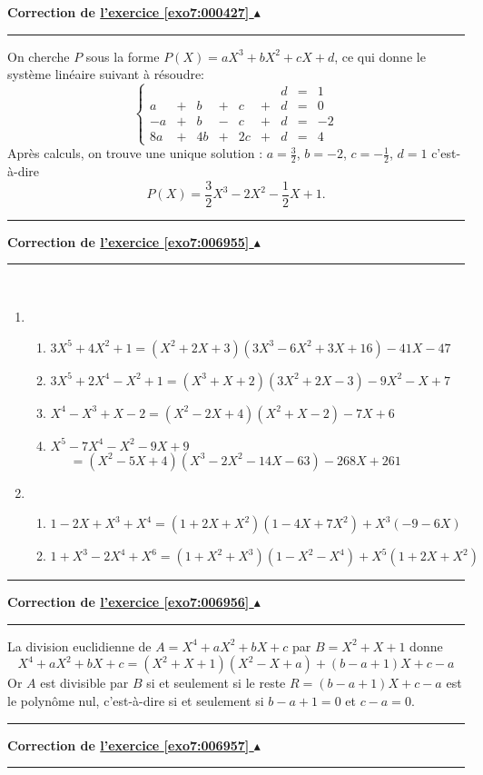 \documentclass[11pt,a4paper]{article}
\newcounter{exo}
\newcommand{\correction}[1]{\hypertarget{cor7:#1}{}\label{cor7:#1}{\bf Correction de \hyperlink{exo7:#1}{l'exercice \ref{exo7:#1} $\blacktriangle$}}\vspace{1mm}\hrule\vspace{1mm}}
\newcommand{\fincorrection}{\vspace{1mm}\hrule\vspace*{7mm}}
\begin{document}
\correction{000427}
On cherche $P$ sous la forme $P(X)=aX^3+bX^2+cX+d$, ce qui donne le système linéaire suivant à résoudre:
$$\left\{\begin{array}{rcrcrcrcr} &&&&&&d&=&1\\a&+&b&+&c&+&d&=&0\\-a&+&b&-&c&+&d&=&-2\\8a&+&4b&+&2c&+&d&=&4\end{array}\right.$$
Après calculs, on trouve une unique solution :
 $a=\frac{3}{2}$, $b=-2$, $c=-\frac{1}{2}$, $d=1$ c'est-à-dire 
 $$P(X)=\frac{3}{2}X^3-2X^2-\frac{1}{2}X+1.$$
\fincorrection
\correction{006955}
\
\begin{enumerate}
\item \begin{enumerate}
\item $3X^5+4X^2+1=(X^2+2X+3)(3X^3-6X^2+3X+16)-41X-47$
\item $3X^5+2X^4-X^2+1=(X^3+X+2)(3X^2+2X-3)-9X^2-X+7$
\item $X^4-X^3+X-2=(X^2-2X+4)(X^2+X-2)-7X+6$
\item $X^5-7X^4-X^2-9X+9$\\
\ \ \ $=(X^2-5X+4)(X^3-2X^2-14X-63)-268X+261$
\end{enumerate}
\item \begin{enumerate}
\item $1-2X+X^3+X^4=(1+2X+X^2)(1-4X+7X^2)+X^3(-9-6X)$
\item $1+X^3-2X^4+X^6=(1+X^2+X^3)(1-X^2-X^4)+X^5(1+2X+X^2)$
\end{enumerate}
\end{enumerate}
\fincorrection
\correction{006956}
La division euclidienne de $A=X^4+aX^2+bX+c$ par $B=X^2+X+1$ donne
$$X^4+aX^2+bX+c=(X^2+X+1)(X^2-X+a)+(b-a+1)X+c-a$$
Or $A$ est divisible par $B$ si et seulement si le reste 
$R=(b-a+1)X+c-a$ est le polynôme nul, 
c'est-à-dire si et seulement si $b-a+1=0$ et $c-a=0$.
\fincorrection
\correction{006957}
\
\end{document}
